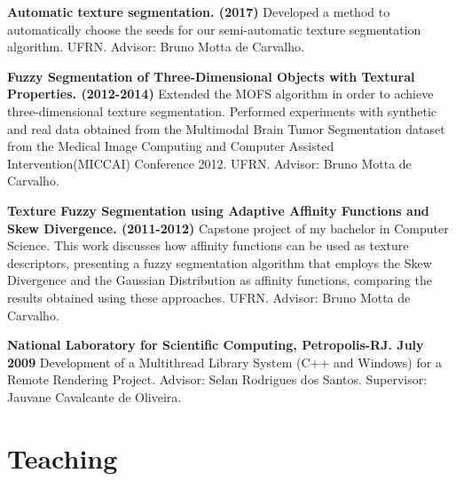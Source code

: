 \documentclass[letterpaper]{article}
\renewenvironment{itemize}{
  \begin{list}{}{
      \setlength{\leftmargin}{1.5em}
    }
  }{
  \end{list}
}
\begin{document}
\begin{itemize}

  \item[$\bullet$] \textbf{Automatic texture segmentation. (2017)}
  Developed a method to automatically  choose  the seeds for our semi-automatic texture segmentation algorithm.
  UFRN. Advisor: Bruno Motta de Carvalho.

  \item[$\bullet$] \textbf{Fuzzy Segmentation of Three-Dimensional Objects with Textural Properties. (2012-2014)}
  Extended the MOFS algorithm in order to achieve three-dimensional texture segmentation. Performed experiments with synthetic and real data obtained from the Multimodal Brain Tumor Segmentation dataset from the Medical Image Computing and Computer Assisted Intervention(MICCAI) Conference 2012.
  UFRN. Advisor: Bruno Motta de Carvalho.

  \item[$\bullet$] \textbf{Texture Fuzzy Segmentation using Adaptive Affinity Functions and Skew Divergence. (2011-2012)}
  Capstone project of my bachelor in Computer Science. This work discusses how affinity functions
  can be used as texture descriptors, presenting a fuzzy segmentation algorithm that employs the Skew
  Divergence and the Gaussian Distribution as affinity functions, comparing the results obtained using
  these approaches.
  UFRN. Advisor: Bruno Motta de Carvalho.
  
  \item[$\bullet$] \textbf{National Laboratory for Scientific Computing, Petropolis-RJ. July 2009}
  Development of a Multithread Library System (C++ and Windows) for a Remote Rendering Project. 
  Advisor: Selan Rodrigues dos Santos. Supervisor: Jauvane Cavalcante de Oliveira.
  
\end{itemize}

\section*{Teaching}
\end{document}
